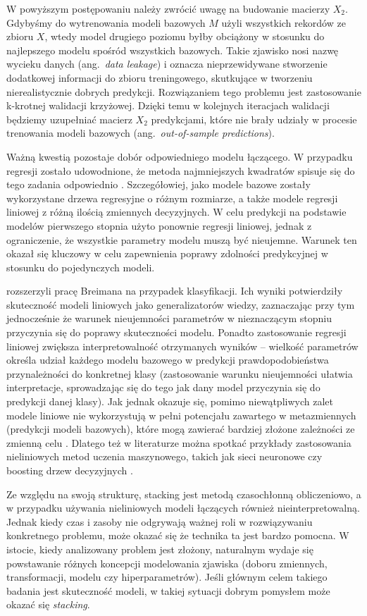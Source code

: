 \documentclass[12pt,a4paper,twoside,openany]{book}
\begin{document}
W powyższym postępowaniu należy zwrócić uwagę na budowanie macierzy $X_2$. Gdybyśmy do wytrenowania modeli bazowych $M$ użyli wszystkich rekordów ze zbioru $X$, wtedy model drugiego poziomu byłby obciążony w stosunku do najlepszego modelu spośród wszystkich bazowych. Takie zjawisko nosi nazwę wycieku danych (ang.~\textit{data leakage}) i oznacza nieprzewidywane stworzenie dodatkowej informacji do zbioru treningowego, skutkujące w tworzeniu nierealistycznie dobrych predykcji. Rozwiązaniem tego problemu jest zastosowanie k-krotnej walidacji krzyżowej. Dzięki temu w kolejnych iteracjach walidacji będziemy uzupełniać macierz $X_2$ predykcjami, które nie brały udziały w procesie trenowania modeli bazowych (ang.~\textit{out-of-sample predictions}).

Ważną kwestią pozostaje dobór odpowiedniego modelu łączącego. W przypadku regresji zostało udowodnione, że metoda najmniejszych kwadratów spisuje się do tego zadania odpowiednio \citep{breiman1996b}. Szczegółowiej, jako modele bazowe zostały wykorzystane drzewa regresyjne o różnym rozmiarze, a także modele regresji liniowej z różną ilością zmiennych decyzyjnych. W celu predykcji na podstawie modelów pierwszego stopnia użyto ponownie regresji liniowej, jednak z ograniczenie, że wszystkie parametry modelu muszą być nieujemne. Warunek ten okazał się kluczowy w celu zapewnienia poprawy zdolności predykcyjnej w stosunku do pojedynczych modeli. 

\citet{ting1999} rozszerzyli pracę Breimana na przypadek klasyfikacji. Ich wyniki potwierdziły skuteczność modeli liniowych jako generalizatorów wiedzy, zaznaczając przy tym jednocześnie że warunek nieujemności parametrów w nieznaczącym stopniu przyczynia się do poprawy skuteczności modelu. Ponadto zastosowanie regresji liniowej zwiększa interpretowalność otrzymanych wyników – wielkość parametrów określa udział każdego modelu bazowego w predykcji prawdopodobieństwa przynależności do konkretnej klasy (zastosowanie warunku nieujemności ułatwia interpretacje, sprowadzając się do tego jak dany model przyczynia się do predykcji danej klasy). Jak jednak okazuje się, pomimo niewątpliwych zalet modele liniowe nie wykorzystują w pełni potencjału zawartego w metazmiennych (predykcji modeli bazowych), które mogą zawierać bardziej złożone zależności ze zmienną celu \citep{sill2009}. Dlatego też w literaturze można spotkać przykłady zastosowania nieliniowych metod uczenia maszynowego, takich jak sieci neuronowe czy boosting drzew decyzyjnych \citep{moudrik2015}.

Ze względu na swoją strukturę, stacking jest metodą czasochłonną obliczeniowo, a w przypadku używania nieliniowych modeli łączących również nieinterpretowalną. Jednak kiedy czas i zasoby nie odgrywają ważnej roli w rozwiązywaniu konkretnego problemu, może okazać się że technika ta jest bardzo pomocna. W istocie, kiedy analizowany problem jest złożony, naturalnym wydaje się powstawanie różnych koncepcji modelowania zjawiska (doboru zmiennych, transformacji, modelu czy hiperparametrów). Jeśli głównym celem takiego badania jest skuteczność modeli, w takiej sytuacji dobrym pomysłem może okazać się \textit{stacking}. 
\end{document}
